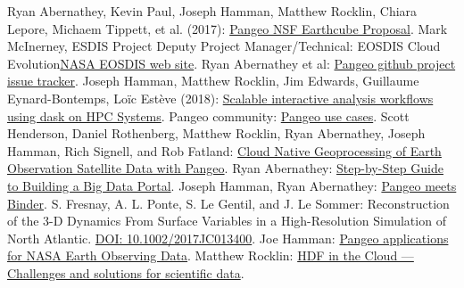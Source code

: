 \documentclass{article}
\begin{document}






\small

\begin{thebibliography}{00}
 Ryan Abernathey, Kevin Paul, Joseph Hamman, Matthew Rocklin, Chiara Lepore, Michaem Tippett, et al. (2017): \href{https://figshare.com/articles/Pangeo_NSF_Earthcube_Proposal/5361094}{Pangeo NSF Earthcube Proposal}.
 Mark McInerney, ESDIS Project Deputy Project Manager/Technical: EOSDIS Cloud Evolution\href{https://earthdata.nasa.gov/about/eosdis-cloud-evolution}{NASA EOSDIS web site}.
 Ryan Abernathey et al: \href{https://github.com/pangeo-data/pangeo/issues}{Pangeo github project issue tracker}.
 Joseph Hamman, Matthew Rocklin, Jim Edwards, Guillaume Eynard-Bontemps, Loïc Estève (2018): \href{https://medium.com/pangeo/dask-jobqueue-d7754e42ca53}{Scalable interactive analysis workflows using dask on HPC Systems}.
 Pangeo community: \href{http://pangeo.io/use_cases/index.html}{Pangeo use cases}.
 Scott Henderson, Daniel Rothenberg, Matthew Rocklin, Ryan Abernathey, Joseph Hamman, Rich Signell, and Rob Fatland: \href{https://medium.com/pangeo/cloud-native-geoprocessing-of-earth-observation-satellite-data-with-pangeo-997692d91ca2}{Cloud Native Geoprocessing of Earth Observation Satellite Data with Pangeo}.
 Ryan Abernathey: \href{https://medium.com/pangeo/step-by-step-guide-to-building-a-big-data-portal-e262af1c2977}{Step-by-Step Guide to Building a Big Data Portal}.
 Joseph Hamman, Ryan Abernathey: \href{https://medium.com/pangeo/pangeo-meets-binder-2ea923feb34f}{Pangeo meets Binder}.
 S. Fresnay, A. L. Ponte, S. Le Gentil, and J. Le Sommer: Reconstruction of the 3-D Dynamics From Surface Variables in
a High-Resolution Simulation of North Atlantic. \href{https://agupubs.onlinelibrary.wiley.com/doi/abs/10.1002/2017JC013400}{DOI: 10.1002/2017JC013400}.
 Joe Hamman: \href{https://medium.com/pangeo/nasa-access-c3515a44f31b}{Pangeo applications for NASA Earth Observing Data}.
 Matthew Rocklin: \href{https://matthewrocklin.com/blog/work/2018/02/06/hdf-in-the-cloud}{HDF in the Cloud --- Challenges and solutions for scientific data}.

\end{thebibliography}
\end{document}
